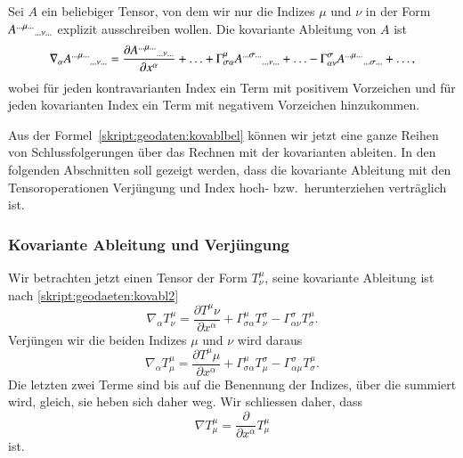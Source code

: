 \begin{definition}
Sei $A$ ein beliebiger Tensor, von dem wir nur die Indizes
$\mu$ und $\nu$ in der Form
$A^{\dots \mu\dots}\mathstrut_{\dots\nu\dots}$
explizit ausschreiben wollen.
Die kovariante Ableitung von $A$ ist
\begin{equation}
\nabla_\alpha A^{\dots \mu\dots}\mathstrut_{\dots\nu\dots}
=
\frac{\partial A^{\dots \mu\dots}\mathstrut_{\dots\nu\dots}}{\partial x^\alpha}
+
\dotsc
+
\Gamma^\mu_{\sigma\alpha}
A^{\dots \sigma\dots}\mathstrut_{\dots\nu\dots}
+
\dotsc
-
\Gamma^\sigma_{\alpha\nu}
A^{\dots \mu\dots}\mathstrut_{\dots\sigma\dots}
+
\dotsc,
\label{skript:geodaten:kovablbel}
\end{equation}
wobei für jeden kontravarianten Index ein Term mit positivem
Vorzeichen und für jeden kovarianten Index ein Term mit negativem
Vorzeichen hinzukommen.
\end{definition}

Aus der Formel~\eqref{skript:geodaten:kovablbel} können wir jetzt eine
ganze Reihen von Schlussfolgerungen über das Rechnen mit der kovarianten
ableiten.
In den folgenden Abschnitten soll gezeigt werden, dass die kovariante
Ableitung mit den Tensoroperationen Verjüngung und Index hoch-
bzw.~herunterziehen verträglich ist.

\subsubsection{Kovariante Ableitung und Verjüngung%
\label{skript:geodaeten:kovablverj}}
Wir betrachten jetzt einen Tensor der Form $T^\mu_\nu$, seine kovariante
Ableitung ist nach \eqref{skript:geodaeten:kovabl2}
\begin{equation}
\nabla_\alpha T^\mu_\nu
=
\frac{\partial T^\mu\nu}{\partial x^\alpha}
+\Gamma^\mu_{\sigma\alpha} T^\sigma_\nu
-\Gamma^\sigma_{\alpha\nu} T^\mu_\sigma.
\end{equation}
Verjüngen wir die beiden Indizes $\mu$ und $\nu$ wird daraus 
\begin{equation}
\nabla_\alpha T^\mu_\mu
=
\frac{\partial T^\mu\mu}{\partial x^\alpha}
+\Gamma^\mu_{\sigma\alpha} T^\sigma_\mu
-\Gamma^\sigma_{\alpha\mu} T^\mu_\sigma.
\label{skript:geodaeten:kovablverj1}
\end{equation}
Die letzten zwei Terme sind bis auf die Benennung der Indizes, über die
summiert wird, gleich, sie heben sich daher weg.
Wir schliessen daher, dass 
\begin{equation}
\nabla T^\mu_\mu = \frac{\partial}{\partial x^\alpha}T^\mu_\mu
\label{skript:geodaeten:kovablverj2}
\end{equation}
ist.

